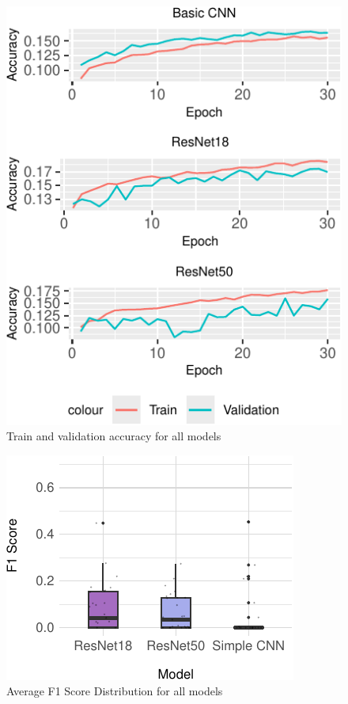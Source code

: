 \documentclass[letterpaper,9pt,twocolumn,twoside,]{pinp}
\begin{document}
\begin{figure}[h]

{\centering \includegraphics{Image02_final_report_files/figure-latex/unnamed-chunk-7-1} 

}

\caption{Train and validation accuracy for all models}\label{fig:unnamed-chunk-7}
\end{figure}

\begin{figure}[h]

{\centering \includegraphics{Image02_final_report_files/figure-latex/unnamed-chunk-8-1} 

}

\caption{Average F1 Score Distribution for all models}\label{fig:unnamed-chunk-8}
\end{figure}
\end{document}
